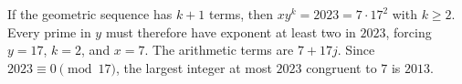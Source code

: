 If the geometric sequence has $k+1$ terms, then $xy^k=2023=7\cdot17^2$ with $k\ge2$. Every prime in $y$ must therefore have exponent at least two in $2023$, forcing $y=17$, $k=2$, and $x=7$. The arithmetic terms are $7+17j$. Since $2023\equiv0\pmod{17}$, the largest integer at most $2023$ congruent to $7$ is $\boxed{2013}$.
